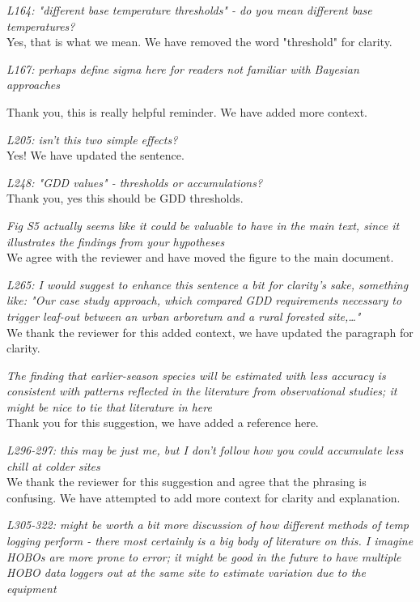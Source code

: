\documentclass[11pt,a4paper]{article}\usepackage[]{graphicx}\usepackage[]{color}
\begin{document}
\textit{L164: "different base temperature thresholds" - do you mean different base temperatures?}\\

Yes, that is what we mean. We have removed the word "threshold" for clarity. 

\textit{L167: perhaps define sigma here for readers not familiar with Bayesian approaches}

Thank you, this is really helpful reminder. We have added more context. 

\textit{L205: isn't this two simple effects?}\\

Yes! We have updated the sentence. 

\textit{L248: "GDD values" - thresholds or accumulations?}\\

Thank you, yes this should be GDD thresholds. 

\textit{Fig S5 actually seems like it could be valuable to have in the main text, since it illustrates the findings from your hypotheses}\\

We agree with the reviewer and have moved the figure to the main document. 

\textit{L265: I would suggest to enhance this sentence a bit for clarity's sake, something like: "Our case study approach, which compared GDD requirements necessary to trigger leaf-out between an urban arboretum and a rural forested site,…"}\\

We thank the reviewer for this added context, we have updated the paragraph for clarity. 

\textit{The finding that earlier-season species will be estimated with less accuracy is consistent with patterns reflected in the literature from observational studies; it might be nice to tie that literature in here}\\

Thank you for this suggestion, we have added a reference here. 

\textit{L296-297: this may be just me, but I don't follow how you could accumulate less chill at colder sites}\\

We thank the reviewer for this suggestion and agree that the phrasing is confusing. We have attempted to add more context for clarity and explanation. 

\textit{L305-322: might be worth a bit more discussion of how different methods of temp logging perform - there most certainly is a big body of literature on this. I imagine HOBOs are more prone to error; it might be good in the future to have multiple HOBO data loggers out at the same site to estimate variation due to the equipment}\\
\end{document}
